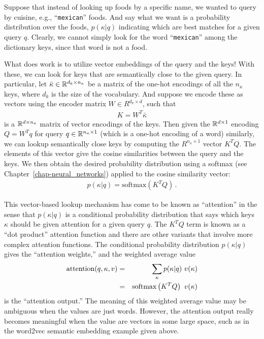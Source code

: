 Suppose that instead of looking up foods by a specific name, we wanted to query by cuisine, e.g., ``{\tt mexican}'' foods.  And say what we want is a probability distribution over the foods, $p(\kappa|q)$ indicating which are best matches for a given query $q$.  Clearly, we cannot simply look for the word ``{\tt mexican}'' among the dictionary keys, since that word is not a food.

What does work is to utilize vector embeddings of the query and the keys!  With these, we can look for keys that are semantically close to the given query.  In particular, let $\bar{\kappa} \in \mathbb{R}^{d_k\times n_\kappa}$ be a matrix of the one-hot encodings of all the $n_\kappa$ keys, where $d_k$ is the size of the vocabulary.  And suppose we encode these as vectors using the encoder matrix $W \in R^{d_k \times d} $, such that
\begin{eqnarray}
  K = W^T \bar{\kappa}
\end{eqnarray}
is a $\mathbb{R}^{ d \times n_\kappa}$ matrix of vector encodings of the keys.  Then given the $\mathbb{R}^{d\times 1}$ encoding $Q = W^T q$ for query $q \in \mathbb{R}^{n_\kappa\times 1}$ (which is a one-hot encoding of a word) similarly, we can lookup semantically close keys by computing the $R^{n_\kappa \times 1}$ vector $K^T Q$.  The elements of this vector give the cosine similarities between the query and the keys.  We then obtain the desired probability distribution using a softmax (see Chapter~\ref{chap-neural_networks}) applied to the cosine similarity vector:
\begin{eqnarray}
  p(\kappa|q) = \text{softmax}\left( K^T Q \right)
  \,.
\end{eqnarray}

This vector-based lookup mechanism has come to be known as ``attention'' in the sense that $p(\kappa|q)$ is a conditional probability distribution that says which keys $\kappa$ should be given attention for a given query $q$.  The $K^T Q$ term is known as a ``dot product'' attention function and there are other variants that involve more complex attention functions.  The conditional probability distribution $p(\kappa | q)$ gives the ``attention weights,'' and the weighted average value
\begin{eqnarray}
  {\rm attention}(q, \kappa, v) &=& \sum_\kappa p(\kappa|q)\ v(\kappa)
  \\
  &=& \text{softmax}\left( K^T Q \right)\ v(\kappa)
\end{eqnarray}
is the ``attention output.''  The meaning of this weighted average value may be ambiguous when the values are just words.  However, the attention output really becomes meaningful when the value are vectors in some large space, such as in the word2vec semantic embedding example given above.

